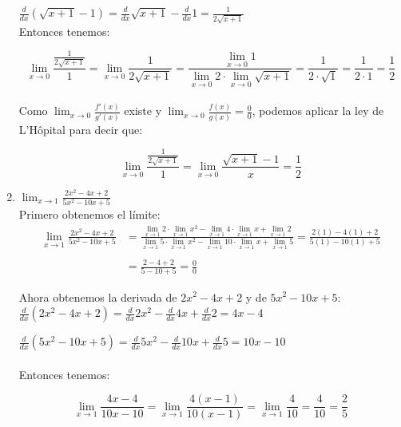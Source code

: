 \documentclass[12pt]{article}
\begin{document}
\begin{enumerate}[\hspace{9px} a)]
        \(\displaystyle\frac{d}{dx}(\sqrt{x+1}-1)=\frac{d}{dx}\sqrt{x+1}-\frac{d}{dx}1=\frac{1}{2\sqrt{x+1}}\)\\

        Entonces tenemos:

        \[\displaystyle\lim_{x \to 0}\frac{\displaystyle\frac{1}{2\sqrt{x+1}}}{1}=\displaystyle\lim_{x \to 0}\frac{1}{2\sqrt{x+1}} = \frac{\displaystyle\lim_{x \to 0}1}{\displaystyle\lim_{x \to 0}2 \cdot \displaystyle\lim_{x \to 0}\sqrt{x+1}}=\frac{1}{2   \cdot \sqrt{1}}=\frac{1}{2 \cdot 1}=\frac{1}{2}\]\\

        Como \(\displaystyle\lim_{x \to 0}\frac{f'(x)}{g'(x)}\) existe y \(\displaystyle\lim_{x \to 0}\frac{f(x)}{g(x)}=\frac{0}{0}\), podemos aplicar la ley de L'H\^opital para decir que:

        \[\displaystyle\lim_{x \to 0}\frac{\displaystyle\frac{1}{2\sqrt{x+1}}}{1}=\displaystyle\lim_{x \to 0}\frac{\sqrt{x+1}-1}{x}=\frac{1}{2}\]

    \item \(\displaystyle\lim_{x \to 1}\frac{2x^2-4x+2}{5x^2-10x+5}\)\\
    
        Primero obtenemos el l\'imite:
        \begin{align*}     
            \displaystyle\lim_{x \to 1}\frac{2x^2-4x+2}{5x^2-10x+5}&=\frac{\displaystyle\lim_{x \to 1}2 \cdot \lim_{x \to 1}x^2 -\lim_{x \to 1}4 \cdot \lim_{x \to 1}x + \lim_{x \to 1}2}{\displaystyle\lim_{x \to 1}5 \cdot \lim_{x \to 1}x^2 - \lim_{x \to 1}10 \cdot \lim_{x \to 1}x + \lim_{x \to 1}5}=\frac{2(1)-4(1)+2}{5(1)-10(1)+5}\\ \\ 
            &= \frac{2-4+2}{5-10+5}=\frac{0}{0}
        \end{align*}

        Ahora obtenemos la derivada de $2x^2-4x+2$ y de $5x^2-10x+5$:\\

        \(\displaystyle\frac{d}{dx}(2x^2-4x+2)=\frac{d}{dx}2x^2-\frac{d}{dx}4x+\frac{d}{dx}2=4x-4\)

        \(\displaystyle\frac{d}{dx}(5x^2-10x+5)=\frac{d}{dx}5x^2-\frac{d}{dx}10x+\frac{d}{dx}5=10x-10\)\\ \\

        Entonces tenemos:

        \[\displaystyle\lim_{x \to 1}\frac{4x-4}{10x-10}=\lim_{x \to 1}\frac{4(x-1)}{10(x-1)} = \lim_{x \to 1}\frac{4}{10} = \frac{4}{10} =\frac{2}{5}\]\\


\end{enumerate}
\end{document}
